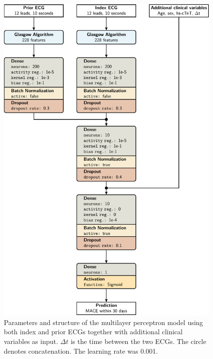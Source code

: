 \documentclass[preprint]{elsarticle}
\begin{document}
\begin{figure}[H]
\centering
\includegraphics[scale=\modelscale,keepaspectratio]{figures/model-mlp4.pdf}
\caption{Parameters and structure of the multilayer perceptron model using both index and prior ECGs together with additional clinical variables as input. $\Delta t$ is the time between the two ECGs. The circle denotes concatenation. The learning rate was 0.001.}
\end{figure}
\end{document}
